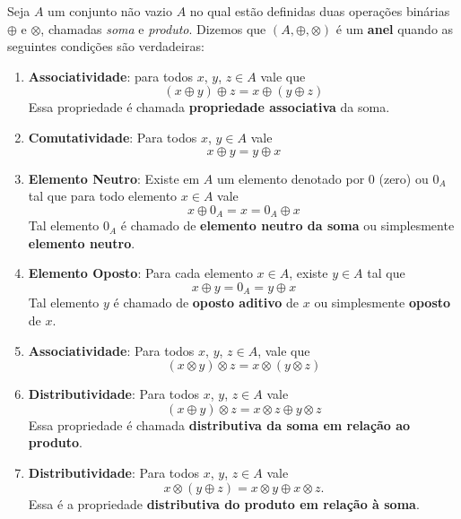 \begin{definicao}
	Seja $A$ um conjunto n{\~a}o vazio $A$ no qual est\~ao definidas duas opera{\c c}{\~o}es bin\'arias $\oplus$ e $\otimes$, chamadas \textit{soma} e \textit{produto}.  Dizemos que $(A, \oplus, \otimes)$ {\'e} um \textbf{anel} quando as seguintes condi{\c c}{\~o}es s{\~a}o verdadeiras:
	\begin{enumerate}[label={\roman*})]
		\item \textbf{Associatividade}: para todos $x$, $y$, $z \in A$ vale que
		\[
			(x \oplus y) \oplus z = x \oplus (y \oplus z)
		\]
		Essa propriedade {\'e} chamada \textbf{propriedade associativa} da soma.

		\item \textbf{Comutatividade}: Para todos $x$, $y \in A$ vale
		\[
			x \oplus y = y \oplus x
		\]

		\item \textbf{Elemento Neutro}: Existe em $A$ um elemento denotado por $0$ (zero) ou $0_{A}$ tal que para todo elemento $x \in A$ vale
		\[
			x \oplus 0_A = x = 0_A \oplus x
		\]
		Tal elemento $0_A$ \'e chamado de \textbf{elemento neutro da soma} ou simplesmente \textbf{elemento neutro}.

		\item \textbf{Elemento Oposto}: Para cada elemento $x \in A$, existe $y \in A$ tal que
		\[
			x \oplus y = 0_A = y \oplus x
		\]
		Tal elemento $y$ \'e chamado de \textbf{oposto aditivo} de $x$ ou simplesmente \textbf{oposto} de $x$.

		\item \textbf{Associatividade}: Para todos $x$, $y$, $z \in A$, vale que
		\[
			(x\otimes y) \otimes z = x\otimes (y\otimes z)
		\]

		\item \textbf{Distributividade}: Para todos $x$, $y$, $z \in A$ vale
		\[
			(x \oplus y)\otimes z = x\otimes z \oplus y\otimes z
		\]
		Essa propriedade {\'e} chamada \textbf{distributiva da soma em rela{\c c}{\~a}o ao produto}.
		
		\item \textbf{Distributividade}: Para todos $x$, $y$, $z \in A$ vale
		\[
			x\otimes(y \oplus z) = x\otimes y \oplus x\otimes z.
		\]
		Essa {\'e} a propriedade \textbf{distributiva do produto em rela{\c c}{\~a}o {\`a} soma}.
	\end{enumerate}
\end{definicao}

